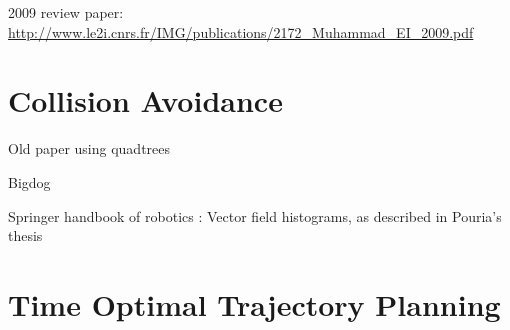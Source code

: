 2009 review paper: \url{http://www.le2i.cnrs.fr/IMG/publications/2172_Muhammad_EI_2009.pdf}

\section{Collision Avoidance}
Old paper using quadtrees\cite{ghoshray1996comprehensive}

Bigdog \cite{raibert2008bigdog}

Springer handbook of robotics \cite{siciliano2008springer}: Vector field histograms, as described in Pouria's thesis \cite{talebifard2014risk}


\section{Time Optimal Trajectory Planning}
\cite{fiorini1996time}

